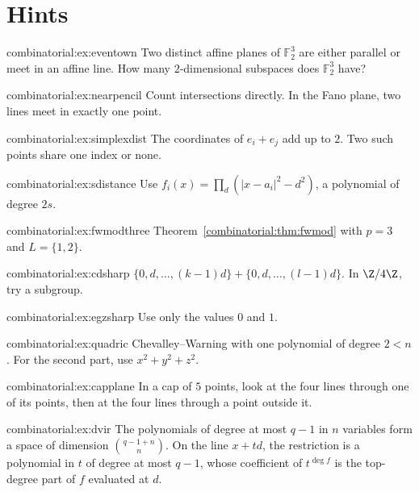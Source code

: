 \section{Hints}

\begin{hint}{combinatorial:ex:eventown}
Two distinct affine planes of $\mathbb F_2^3$ are either parallel or meet in an affine line. How many $2$-dimensional subspaces does $\mathbb F_2^3$ have?
\end{hint}
\begin{hint}{combinatorial:ex:nearpencil}
Count intersections directly. In the Fano plane, two lines meet in exactly one point.
\end{hint}
\begin{hint}{combinatorial:ex:simplexdist}
The coordinates of $e_i+e_j$ add up to $2$. Two such points share one index or none.
\end{hint}
\begin{hint}{combinatorial:ex:sdistance}
Use $f_i(x)=\prod_{d}(|x-a_i|^2-d^2)$, a polynomial of degree $2s$.
\end{hint}
\begin{hint}{combinatorial:ex:fwmodthree}
Theorem~\ref{combinatorial:thm:fwmod} with $p=3$ and $L=\{1,2\}$.
\end{hint}
\begin{hint}{combinatorial:ex:cdsharp}
$\{0,d,\dots,(k-1)d\}+\{0,d,\dots,(l-1)d\}$. In $\Z/4\Z$, try a subgroup.
\end{hint}
\begin{hint}{combinatorial:ex:egzsharp}
Use only the values $0$ and $1$.
\end{hint}
\begin{hint}{combinatorial:ex:quadric}
Chevalley--Warning with one polynomial of degree $2<n$. For the second part, use $x^2+y^2+z^2$.
\end{hint}
\begin{hint}{combinatorial:ex:capplane}
In a cap of $5$ points, look at the four lines through one of its points, then at the four lines through a point outside it.
\end{hint}
\begin{hint}{combinatorial:ex:dvir}
The polynomials of degree at most $q-1$ in $n$ variables form a space of dimension $\binom{q-1+n}n$. On the line $x+td$, the restriction is a polynomial in $t$ of degree at most $q-1$, whose coefficient
of $t^{\deg f}$ is the top-degree part of $f$ evaluated at $d$.
\end{hint}

